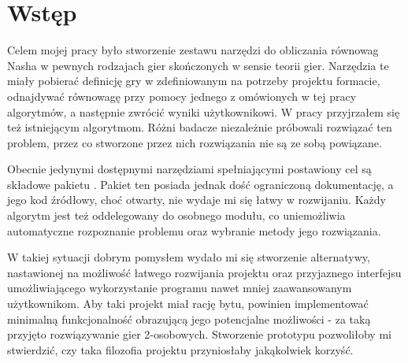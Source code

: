 \documentclass[polish]{standalone}
\begin{document}
\pagestyle{headings}

\section*{Wstęp}

Celem mojej pracy było stworzenie zestawu narzędzi do obliczania równowag Nasha w pewnych rodzajach gier skończonych
w sensie teorii gier. Narzędzia te miały pobierać definicję gry w zdefiniowanym na potrzeby projektu formacie,
odnajdywać równowagę przy pomocy jednego z omówionych w tej pracy algorytmów, a następnie zwrócić wyniki użytkownikowi.
W pracy przyjrzałem się też istniejącym algorytmom. Różni badacze niezależnie próbowali rozwiązać ten problem, przez
co stworzone przez nich rozwiązania nie są ze sobą powiązane.

Obecnie jedynymi dostępnymi narzędziami spełniającymi postawiony cel są składowe pakietu . Pakiet ten
posiada jednak dość ograniczoną dokumentację, a jego kod źródłowy, choć otwarty, nie wydaje mi się łatwy w rozwijaniu.
Każdy algorytm jest też oddelegowany do osobnego modułu, co uniemożliwia automatyczne rozpoznanie problemu oraz
wybranie metody jego rozwiązania.

W takiej sytuacji dobrym pomysłem wydało mi się stworzenie alternatywy, nastawionej na możliwość łatwego rozwijania
projektu oraz przyjaznego interfejsu umożliwiającego wykorzystanie programu nawet mniej zaawansowanym użytkownikom. Aby
taki projekt miał rację bytu, powinien implementować minimalną funkcjonalność obrazującą jego potencjalne możliwości
- za taką przyjęto rozwiązywanie gier 2-osobowych. Stworzenie prototypu pozwoliłoby mi stwierdzić, czy taka filozofia
projektu przyniosłaby jakąkolwiek korzyść.
\end{document}
